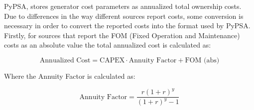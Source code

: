 \documentclass[preprint,12pt,nopreprintline]{elsarticle}
\begin{document}
\begin{table}[H]
\centering
\caption{Cost assumptions for generation technologies \cite{TechnologyDataGeneration2024} \cite{FutureGeothermalEnergy2024} \cite{ProjectedCostsGenerating}}
\label{tab:costs}
\end{table}

\medskip
\noindent
PyPSA, stores generator cost parameters as annualized total ownership costs. Due to differences in the way different sources report costs, some conversion is necessary in order to convert the reported costs into the format used by PyPSA. Firstly, for sources that report the FOM (Fixed Operation and Maintenance) costs as an absolute value the total annualized cost is calculated as:

\begin{equation}
\text{Annualized Cost}
=
\text{CAPEX} \cdot \text{Annuity Factor} + \text{FOM (abs)}
\end{equation}

\medskip
\noindent
Where the Annuity Factor is calculated as:

\medskip
\begin{equation}
\text{Annuity Factor}
=
\frac{r(1+r)^y}{(1+r)^y - 1}
\end{equation}
\end{document}

